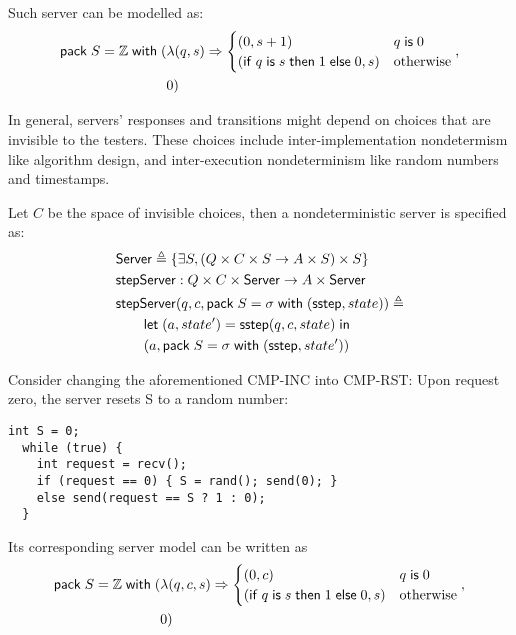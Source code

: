 Such server can be modelled as:
\begin{align*}
  \mathsf{pack}\;S=\mathbb Z\;\mathsf{with}\;(&\lambda(q,s)\Rightarrow\begin{cases}
        (0,s+1)&q\;\mathsf{is}\;0\\
        (\mathsf{if}\; q\;\mathsf{is}\; s\;\mathsf{then}\;1\;\mathsf{else}\;0,s)&\mathrm{otherwise}
    \end{cases},\\
    &0)
\end{align*}

In general, servers' responses and transitions might depend on choices that are
invisible to the testers.  These choices include inter-implementation
nondetermism like algorithm design, and inter-execution nondeterminism like
random numbers and timestamps.
\begin{definition}
  Let $C$ be the space of invisible choices, then a nondeterministic server is
  specified as:
\begin{align*}
  &\mathsf{Server}\triangleq\{\exists S,(Q \times C \times S \to A \times S) \times S\} \\
  &\mathsf{stepServer}:Q\times C \times \mathsf{Server} \to A\times \mathsf{Server} \\
  &\mathsf{stepServer}(q,c,\mathsf{pack}\;S=\sigma\;\mathsf{with}\;(\mathsf{sstep}, state))\triangleq\\
  &\qquad\mathsf{let}\;(a,state')=\mathsf{sstep}(q,c,state)\;\mathsf{in}\; \\
  &\qquad(a, \mathsf{pack}\;S=\sigma\;\mathsf{with}\;(\mathsf{sstep}, state'))
\end{align*}
\end{definition}

Consider changing the aforementioned CMP-INC into CMP-RST: Upon request zero,
the server resets \inlinec S to a random number:
\begin{lstlisting}[style=customc]
  int S = 0;
  while (true) {
    int request = recv();
    if (request == 0) { S = rand(); send(0); }
    else send(request == S ? 1 : 0);
  }
\end{lstlisting}
Its corresponding server model can be written as
\begin{align*}
  \mathsf{pack}\;S=\mathbb Z\;\mathsf{with}\;(&\lambda(q,c,s)\Rightarrow
      \begin{cases}
        (0,c)& q\;\mathsf{is}\;0\\
        (\mathsf{if}\; q\;\mathsf{is}\; s\;\mathsf{then}\; 1\;\mathsf{else}\; 0,s)&\mathrm{otherwise}
      \end{cases}
   ,\\
    &0)
\end{align*}

